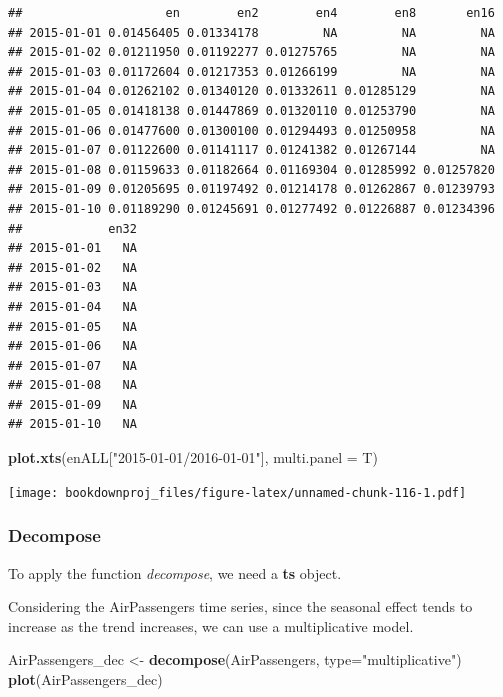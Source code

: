\documentclass[
]{article}
\newenvironment{Shaded}{\begin{snugshade}}{\end{snugshade}}
\newcommand{\DataTypeTok}[1]{\textcolor[rgb]{0.13,0.29,0.53}{#1}}
\newcommand{\KeywordTok}[1]{\textcolor[rgb]{0.13,0.29,0.53}{\textbf{#1}}}
\newcommand{\NormalTok}[1]{#1}
\newcommand{\StringTok}[1]{\textcolor[rgb]{0.31,0.60,0.02}{#1}}
\begin{document}
\begin{verbatim}
##                    en        en2        en4        en8       en16
## 2015-01-01 0.01456405 0.01334178         NA         NA         NA
## 2015-01-02 0.01211950 0.01192277 0.01275765         NA         NA
## 2015-01-03 0.01172604 0.01217353 0.01266199         NA         NA
## 2015-01-04 0.01262102 0.01340120 0.01332611 0.01285129         NA
## 2015-01-05 0.01418138 0.01447869 0.01320110 0.01253790         NA
## 2015-01-06 0.01477600 0.01300100 0.01294493 0.01250958         NA
## 2015-01-07 0.01122600 0.01141117 0.01241382 0.01267144         NA
## 2015-01-08 0.01159633 0.01182664 0.01169304 0.01285992 0.01257820
## 2015-01-09 0.01205695 0.01197492 0.01214178 0.01262867 0.01239793
## 2015-01-10 0.01189290 0.01245691 0.01277492 0.01226887 0.01234396
##            en32
## 2015-01-01   NA
## 2015-01-02   NA
## 2015-01-03   NA
## 2015-01-04   NA
## 2015-01-05   NA
## 2015-01-06   NA
## 2015-01-07   NA
## 2015-01-08   NA
## 2015-01-09   NA
## 2015-01-10   NA
\end{verbatim}

\begin{Shaded}
\begin{Highlighting}[]
\KeywordTok{plot.xts}\NormalTok{(enALL[}\StringTok{"2015-01-01/2016-01-01"}\NormalTok{], }\DataTypeTok{multi.panel =}\NormalTok{ T)}
\end{Highlighting}
\end{Shaded}

\texttt{[image: bookdownproj\_files/figure-latex/unnamed-chunk-116-1.pdf]}

\hypertarget{decompose}{%
\subsubsection{Decompose}\label{decompose}}

To apply the function \emph{decompose}, we need a \textbf{ts} object.

Considering the AirPassengers time series, since the seasonal effect tends to increase as the trend increases, we can use a multiplicative model.

\begin{Shaded}
\begin{Highlighting}[]
\NormalTok{AirPassengers_dec <-}\StringTok{ }\KeywordTok{decompose}\NormalTok{(AirPassengers, }\DataTypeTok{type=}\StringTok{"multiplicative"}\NormalTok{)}
\KeywordTok{plot}\NormalTok{(AirPassengers_dec)}
\end{Highlighting}
\end{Shaded}
\end{document}
